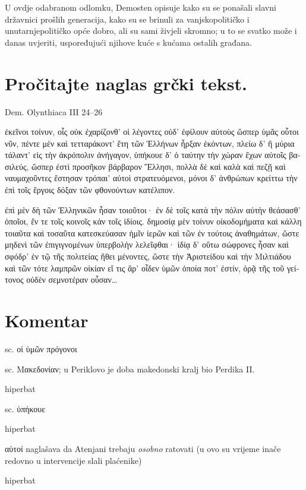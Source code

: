 U ovdje odabranom odlomku, Demosten opisuje kako su se ponašali slavni državnici prošlih generacija, kako su se brinuli za vanjskopolitičko i unutarnjepolitičko opće dobro, ali su sami živjeli skromno; u to se svatko može i danas uvjeriti, uspoređujući njihove kuće s kućama ostalih građana.



\section*{Pročitajte naglas grčki tekst.}

Dem. Olynthiaca III 24–26


\medskip


{\large

\begin{greek}

\noindent  ἐκεῖνοι τοίνυν, οἷς οὐκ ἐχαρίζονθ' οἱ λέγοντες οὐδ' ἐφίλουν αὐτοὺς ὥσπερ ὑμᾶς οὗτοι νῦν, πέντε μὲν καὶ τετταράκοντ' ἔτη τῶν Ἑλλήνων ἦρξαν ἑκόντων, πλείω δ' ἢ μύρια τάλαντ' εἰς τὴν ἀκρόπολιν ἀνήγαγον, ὑπήκουε δ' ὁ ταύτην τὴν χώραν ἔχων αὐτοῖς βασιλεύς, ὥσπερ ἐστὶ προσῆκον βάρβαρον Ἕλλησι, πολλὰ δὲ καὶ καλὰ καὶ πεζῇ καὶ ναυμαχοῦντες ἔστησαν τρόπαι' αὐτοὶ στρατευόμενοι, μόνοι δ' ἀνθρώπων κρείττω τὴν ἐπὶ τοῖς ἔργοις δόξαν τῶν φθονούντων κατέλιπον.

ἐπὶ μὲν δὴ τῶν Ἑλληνικῶν ἦσαν τοιοῦτοι· ἐν δὲ τοῖς κατὰ τὴν πόλιν αὐτὴν θεάσασθ' ὁποῖοι, ἔν τε τοῖς κοινοῖς κἀν τοῖς ἰδίοις. δημοσίᾳ μὲν τοίνυν οἰκοδομήματα καὶ κάλλη τοιαῦτα καὶ τοσαῦτα κατεσκεύασαν ἡμῖν ἱερῶν καὶ τῶν ἐν τούτοις ἀναθημάτων, ὥστε μηδενὶ τῶν ἐπιγιγνομένων ὑπερβολὴν λελεῖφθαι· ἰδίᾳ δ' οὕτω σώφρονες ἦσαν καὶ σφόδρ' ἐν τῷ τῆς πολιτείας ἤθει μένοντες, ὥστε τὴν Ἀριστείδου καὶ τὴν Μιλτιάδου καὶ τῶν τότε λαμπρῶν οἰκίαν εἴ τις ἄρ' οἶδεν ὑμῶν ὁποία ποτ' ἐστίν, ὁρᾷ τῆς τοῦ γείτονος οὐδὲν σεμνοτέραν οὖσαν\dots

\end{greek}

}


\section*{Komentar}


\begin{description}[noitemsep]
\item[ἐκεῖνοι] sc. οἱ ὑμῶν πρόγονοι
\item[ταύτην τὴν χώραν] sc. Μακεδονίαν; u Periklovo je doba makedonski kralj bio Perdika II.
\item[ὁ\dots\ ἔχων\dots\ βασιλεύς] hiperbat
\item[βάρβαρον Ἕλλησι] sc. ὑπήκουε
\item[πολλὰ δὲ καὶ καλὰ\dots\ τρόπαι'] hiperbat
\item[αὐτοὶ στρατευόμενοι] αὐτοί naglašava da Atenjani trebaju \textit{osobno} ratovati (u ovo su vrijeme inače redovno u intervencije slali plaćenike)
\item[κρείττω\dots\ τῶν φθονούντων] hiperbat
\end{description}

